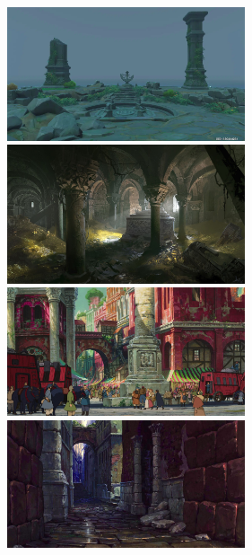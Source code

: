\documentclass[10pt, a4paper]{report}
\begin{document}
\begin{multicols}{2}
\includegraphics[width=7cm]{ruins.png}\\

\includegraphics[width=7cm]{insideruins.jpg}\\

\includegraphics[width=7cm]{ruinsincity.jpg}\\

\includegraphics[width=7cm]{ruinsinwall.png}\\
\end{multicols}
\end{document}

